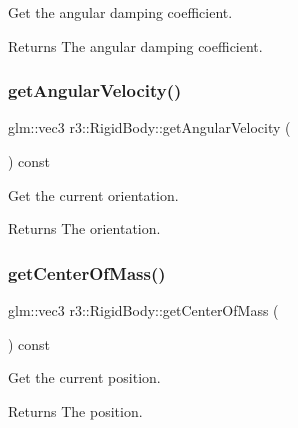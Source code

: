 Get the angular damping coefficient. 

\begin{DoxyReturn}{Returns}
The angular damping coefficient. 
\end{DoxyReturn}
\mbox{\label{classr3_1_1_rigid_body_a0d60576d3d08d10cd529306a3a5888d7}} 
\subsubsection{\texorpdfstring{get\+Angular\+Velocity()}{getAngularVelocity()}}
{\footnotesize\ttfamily glm\+::vec3 r3\+::\+Rigid\+Body\+::get\+Angular\+Velocity (\begin{DoxyParamCaption}{ }\end{DoxyParamCaption}) const}



Get the current orientation. 

\begin{DoxyReturn}{Returns}
The orientation. 
\end{DoxyReturn}
\mbox{\label{classr3_1_1_rigid_body_a9b802fe5774292fbc6ce80cccab15151}} 
\subsubsection{\texorpdfstring{get\+Center\+Of\+Mass()}{getCenterOfMass()}}
{\footnotesize\ttfamily glm\+::vec3 r3\+::\+Rigid\+Body\+::get\+Center\+Of\+Mass (\begin{DoxyParamCaption}{ }\end{DoxyParamCaption}) const}



Get the current position. 

\begin{DoxyReturn}{Returns}
The position. 
\end{DoxyReturn}
\mbox{\label{classr3_1_1_rigid_body_ac138908f5f7aa4763683d9bdd4cc9fd5}} 
